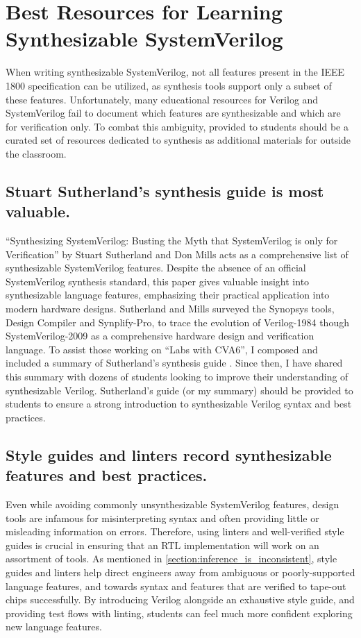 
\chapter{Best Resources for Learning Synthesizable SystemVerilog}
\label{chapter:resources}

When writing synthesizable SystemVerilog, not all features present in the IEEE 1800 specification can be utilized, as synthesis tools support only a subset of these features.
Unfortunately, many educational resources for Verilog and SystemVerilog fail to document which features are synthesizable and which are for verification only.
To combat this ambiguity, provided to students should be a curated set of resources dedicated to synthesis as additional materials for outside the classroom.

\section{Stuart Sutherland's synthesis guide is most valuable.}

\enquote{Synthesizing SystemVerilog: Busting the Myth that SystemVerilog is only for Verification} by Stuart Sutherland and Don Mills acts as a comprehensive list of synthesizable SystemVerilog features.
Despite the absence of an official SystemVerilog synthesis standard, this paper gives valuable insight into synthesizable language features, emphasizing their practical application into modern hardware designs.
Sutherland and Mills surveyed the Synopsys tools, Design Compiler and Synplify-Pro, to trace the evolution of Verilog-1984 though SystemVerilog-2009 as a comprehensive hardware design and verification language.
To assist those working on \enquote{Labs with CVA6}, I composed and included a summary of Sutherland's synthesis guide \cite{labsWithCVA6}.
Since then, I have shared this summary with dozens of students looking to improve their understanding of synthesizable Verilog.
Sutherland's guide (or my summary) should be provided to students to ensure a strong introduction to synthesizable Verilog syntax and best practices.

\section{Style guides and linters record synthesizable features and best practices.}
\label{section:style_guides}

Even while avoiding commonly unsynthesizable SystemVerilog features, design tools are infamous for misinterpreting syntax and often providing little or misleading information on errors.
Therefore, using linters and well-verified style guides is crucial in ensuring that an RTL implementation will work on an assortment of tools.
As mentioned in \autoref{section:inference_is_inconsistent}, style guides and linters help direct engineers away from ambiguous or poorly-supported language features, and towards syntax and features that are verified to tape-out chips successfully.
By introducing Verilog alongside an exhaustive style guide, and providing test flows with linting, students can feel much more confident exploring new language features.

